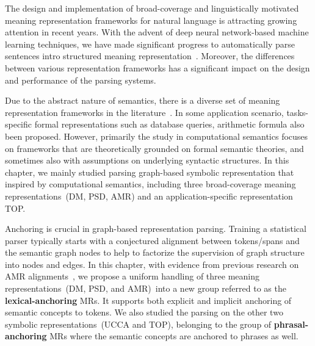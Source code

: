 The design and implementation of broad-coverage and linguistically
motivated meaning representation frameworks for natural language is
attracting growing attention in recent years. With the advent of deep
neural network-based machine learning techniques, we have made
significant progress to automatically parse sentences intro structured
meaning
representation~\citep{Oep:Kuh:Miy:14,Oep:Kuh:Miy:15,May:2016wc,hershcovich-etal-2019-semeval}. Moreover,
the differences between various representation frameworks has a
significant impact on the design and performance of the parsing
systems.

Due to the abstract nature of semantics, there is a diverse set of
meaning representation frameworks in the
literature~\citep{abend2017state}. In some application scenario,
tasks-specific formal representations such as database queries,
arithmetic formula also been proposed.  However, primarily the study
in computational semantics focuses on frameworks that are
theoretically grounded on formal semantic theories, and sometimes also
with assumptions on underlying syntactic structures. In this chapter,
we mainly studied parsing graph-based symbolic representation that
inspired by computational semantics, including three broad-coverage
meaning representations~(DM, PSD, AMR) and an application-specific
representation TOP.

Anchoring is crucial in graph-based representation parsing. Training a
statistical parser typically starts with a conjectured alignment
between tokens/spans and the semantic graph nodes to help to factorize
the supervision of graph structure into nodes and edges. In this
chapter, with evidence from previous research on AMR
alignments~\citep{Pourdamghani:2014aligning,Flanigan:2014vc,Wang:2017vt,chen2017unsupervised,szubert2018structured,lyu2018amr},
we propose a uniform handling of three meaning representations~(DM,
PSD, and AMR)~into a new group referred to as the
\textbf{lexical-anchoring} MRs. It supports both explicit and implicit
anchoring of semantic concepts to tokens.  We also studied the parsing
on the other two symbolic representations~(UCCA and TOP), belonging to
the group of \textbf{phrasal-anchoring} MRs where the semantic
concepts are anchored to phrases as well.

